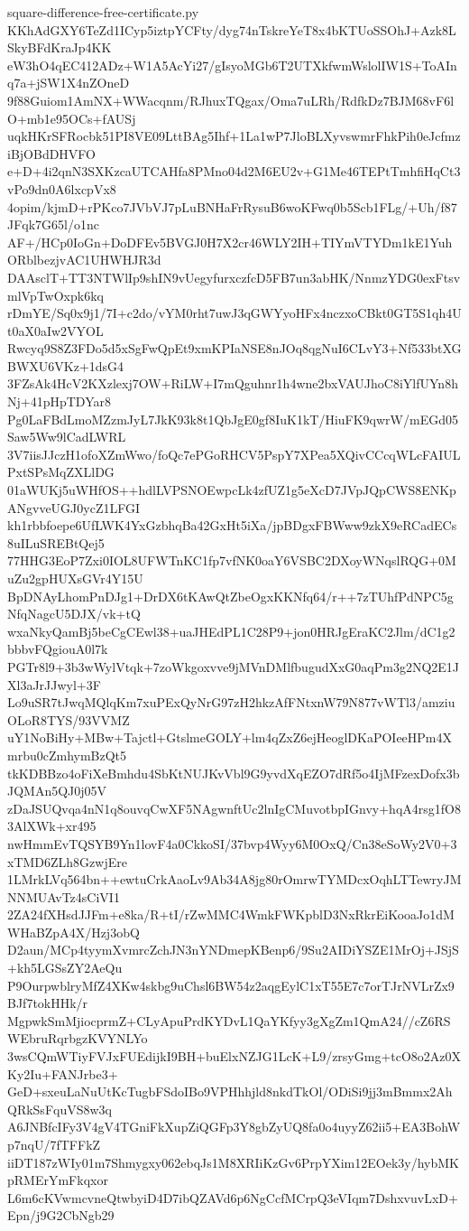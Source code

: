 \documentclass[11pt]{article}
\theoremstyle{definition}
\theoremstyle{remark}
\begin{document}
\begin{filecontents*}[overwrite]{square-difference-free-certificate.py}
KKhAdGXY6TeZd1ICyp5iztpYCFty/dyg74nTskreYeT8x4bKTUoSSOhJ+Azk8LSkyBFdKraJp4KK
eW3hO4qEC412ADz+W1A5AcYi27/gIsyoMGb6T2UTXkfwmWslolIW1S+ToAInq7a+jSW1X4nZOneD
9f88Guiom1AmNX+WWacqnm/RJhuxTQgax/Oma7uLRh/RdfkDz7BJM68vF6lO+mb1e95OCs+fAUSj
uqkHKrSFRocbk51PI8VE09LttBAg5Ihf+1La1wP7JloBLXyvswmrFhkPih0eJcfmziBjOBdDHVFO
e+D+4i2qnN3SXKzcaUTCAHfa8PMno04d2M6EU2v+G1Me46TEPtTmhfiHqCt3vPo9dn0A6lxcpVx8
4opim/kjmD+rPKco7JVbVJ7pLuBNHaFrRysuB6woKFwq0b5Scb1FLg/+Uh/f87JFqk7G65l/o1nc
AF+/HCp0IoGn+DoDFEv5BVGJ0H7X2cr46WLY2IH+TIYmVTYDm1kE1YuhORblbezjvAC1UHWHJR3d
DAAsclT+TT3NTWlIp9shIN9vUegyfurxczfcD5FB7un3abHK/NnmzYDG0exFtsvmlVpTwOxpk6kq
rDmYE/Sq0x9j1/7I+c2do/vYM0rht7uwJ3qGWYyoHFx4nczxoCBkt0GT5S1qh4Ut0aX0aIw2VYOL
Rwcyq9S8Z3FDo5d5xSgFwQpEt9xmKPIaNSE8nJOq8qgNuI6CLvY3+Nf533btXGBWXU6VKz+1dsG4
3FZsAk4HcV2KXzlexj7OW+RiLW+I7mQguhnr1h4wne2bxVAUJhoC8iYlfUYn8hNj+41pHpTDYar8
Pg0LaFBdLmoMZzmJyL7JkK93k8t1QbJgE0gf8IuK1kT/HiuFK9qwrW/mEGd05Saw5Ww9lCadLWRL
3V7iisJJczH1ofoXZmWwo/foQc7ePGoRHCV5PspY7XPea5XQivCCcqWLcFAIULPxtSPsMqZXLlDG
01aWUKj5uWHfOS++hdlLVPSNOEwpcLk4zfUZ1g5eXcD7JVpJQpCWS8ENKpANgvveUGJ0ycZ1LFGI
kh1rbbfoepe6UfLWK4YxGzbhqBa42GxHt5iXa/jpBDgxFBWww9zkX9eRCadECs8uILuSREBtQej5
77HHG3EoP7Zxi0IOL8UFWTnKC1fp7vfNK0oaY6VSBC2DXoyWNqslRQG+0MuZu2gpHUXsGVr4Y15U
BpDNAyLhomPnDJg1+DrDX6tKAwQtZbeOgxKKNfq64/r++7zTUhfPdNPC5gNfqNagcU5DJX/vk+tQ
wxaNkyQamBj5beCgCEwl38+uaJHEdPL1C28P9+jon0HRJgEraKC2Jlm/dC1g2bbbvFQgiouA0l7k
PGTr8l9+3b3wWylVtqk+7zoWkgoxvve9jMVnDMlfbugudXxG0aqPm3g2NQ2E1JXl3aJrJJwyl+3F
Lo9uSR7tJwqMQlqKm7xuPExQyNrG97zH2hkzAfFNtxnW79N877vWTl3/amziuOLoR8TYS/93VVMZ
uY1NoBiHy+MBw+Tajctl+GtslmeGOLY+lm4qZxZ6ejHeoglDKaPOIeeHPm4Xmrbu0cZmhymBzQt5
tkKDBBzo4oFiXeBmhdu4SbKtNUJKvVbl9G9yvdXqEZO7dRf5o4IjMFzexDofx3bJQMAn5QJ0j05V
zDaJSUQvqa4nN1q8ouvqCwXF5NAgwnftUc2lnIgCMuvotbpIGnvy+hqA4rsg1fO83AlXWk+xr495
nwHmmEvTQSYB9Yn1lovF4a0CkkoSI/37bvp4Wyy6M0OxQ/Cn38eSoWy2V0+3xTMD6ZLh8GzwjEre
1LMrkLVq564bn++ewtuCrkAaoLv9Ab34A8jg80rOmrwTYMDcxOqhLTTewryJMNNMUAvTz4sCiVI1
2ZA24fXHsdJJFm+e8ka/R+tI/rZwMMC4WmkFWKpblD3NxRkrEiKooaJo1dMWHaBZpA4X/Hzj3obQ
D2aun/MCp4tyymXvmrcZchJN3nYNDmepKBenp6/9Su2AIDiYSZE1MrOj+JSjS+kh5LGSsZY2AeQu
P9OurpwblryMfZ4XKw4skbg9uChsl6BW54z2aqgEylC1xT55E7c7orTJrNVLrZx9BJf7tokHHk/r
MgpwkSmMjiocprmZ+CLyApuPrdKYDvL1QaYKfyy3gXgZm1QmA24//cZ6RSWEbruRqrbgzKVYNLYo
3wsCQmWTiyFVJxFUEdijkI9BH+buElxNZJG1LcK+L9/zrsyGmg+tcO8o2Az0XKy2Iu+FANJrbe3+
GeD+sxeuLaNuUtKcTugbFSdoIBo9VPHhhjld8nkdTkOl/ODiSi9jj3mBmmx2AhQRkSsFquVS8w3q
A6JNBfcIFy3V4gV4TGniFkXupZiQGFp3Y8gbZyUQ8fa0o4uyyZ62ii5+EA3BohWp7nqU/7fTFFkZ
iiDT187zWIy01m7Shmygxy062ebqJs1M8XRIiKzGv6PrpYXim12EOek3y/hybMKpRMErYmFkqxor
L6m6cKVwmcvneQtwbyiD4D7ibQZAVd6p6NgCcfMCrpQ3eVIqm7DshxvuvLxD+Epn/j9G2CbNgb29

\end{filecontents*}
\end{document}

